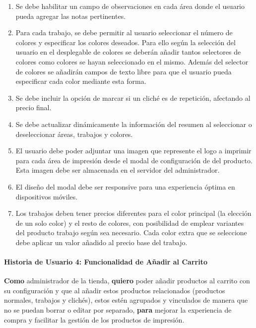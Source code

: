 \documentclass[11pt]{article}
\newcommand{\subsubsubsection}[1]{\paragraph{#1}}
\begin{document}
\begin{enumerate}[label=\arabic*.]
    \item Se debe habilitar un campo de observaciones en cada área donde el usuario pueda agregar las notas pertinentes.
    \item Para cada trabajo, se debe permitir al usuario seleccionar el número de colores y especificar los colores deseados. Para ello según la selección del usuario en el desplegable de colores se deberán añadir tantos selectores de colores como colores se hayan seleccionado en el mismo. Además del selector de colores se añadirán campos de texto libre para que el usuario pueda especificar cada color mediante esta forma.
    \item Se debe incluir la opción de marcar si un cliché es de repetición, afectando al precio final.
    \item Se debe actualizar dinámicamente la información del resumen al seleccionar o deseleccionar áreas, trabajos y colores.
    \item El usuario debe poder adjuntar una imagen que represente el logo a imprimir para cada área de impresión desde el modal de configuración de del producto. Esta imagen debe ser almacenada en el servidor del administrador.
    \item El diseño del modal debe ser responsive para una experiencia óptima en dispositivos móviles.
    \item Los trabajos deben tener precios diferentes para el color principal (la elección de un solo color) y el resto de colores, con posibilidad de emplear variantes del producto trabajo según sea necesario. Cada color extra que se seleccione debe aplicar un valor añadido al precio base del trabajo.
\end{enumerate}


\subsubsubsection{Historia de Usuario 4: Funcionalidad de Añadir al Carrito}\label{sec:historia4}

\textbf{Como} administrador de la tienda,
\textbf{quiero} poder añadir productos al carrito con su configuración y que al añadir estos productos relacionados (productos normales, trabajos y clichés), estos estén agrupados y vinculados de manera que no se puedan borrar o editar por separado,
\textbf{para} mejorar la experiencia de compra y facilitar la gestión de los productos de impresión.
\end{document}
